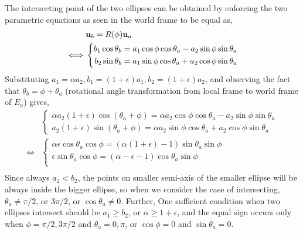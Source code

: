 \documentclass{article}
\begin{document}
The intersecting point of the two ellipses can be obtained by enforcing the two parametric equations as seen in the world frame to be equal as,
\begin{equation}
\begin{aligned}
& {\bf u}_b = R(\phi) {\bf u}_a \\
\iff & \left\{
\begin{aligned}
b_1 \cos\theta_b = a_1\cos\phi \cos\theta_a - a_2\sin\phi \sin\theta_a\\
b_2 \sin\theta_b = a_1\sin\phi \cos\theta_a + a_2\cos\phi \sin\theta_a
\end{aligned}
\right.\\
\end{aligned}
\end{equation}
Substituting $a_1 = \alpha a_2, b_1 = (1+\epsilon)a_1, b_2 = (1+\epsilon)a_2$, and observing the fact that $\theta_b = \phi + \theta_a$ (rotational angle transformation from local frame to world frame of $E_a$) gives,
\begin{equation}
\begin{aligned}
& \left\{
\begin{aligned}
\alpha a_2 (1+\epsilon) \cos(\theta_a + \phi) = \alpha a_2 \cos\phi \cos\theta_a - a_2\sin\phi \sin\theta_a\\
a_2 (1+\epsilon) \sin(\theta_a + \phi) = \alpha a_2 \sin\phi \cos\theta_a + a_2\cos\phi \sin\theta_a
\end{aligned}
\right. \\
\iff & 
\left\{
\begin{aligned}
\alpha \epsilon \cos\theta_a \cos\phi = (\alpha(1+\epsilon) - 1) \sin\theta_a \sin\phi \\
\epsilon \sin\theta_a \cos\phi = (\alpha - \epsilon - 1) \cos\theta_a \sin\phi \\
\end{aligned}
\right. \\
\end{aligned}
\end{equation}
Since always $a_2 < b_2$, the points on smaller semi-axis of the smaller ellipse will be always inside the bigger ellipse, so when we consider the case of intersecting, $\theta_a \neq \pi/2$, or $3\pi/2$, or $\cos\theta_a \neq 0$. Further, One sufficient condition when two ellipses intersect should be $a_1 \geq b_2$, or $\alpha \geq 1+\epsilon$, and the equal sign occurs only when $\phi = \pi/2, 3\pi/2$ and $\theta_a = 0, \pi$, or $\cos\phi = 0$ and $\sin\theta_a = 0$.
\end{document}
